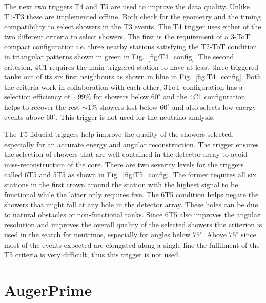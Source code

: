 The next two triggers T4 and T5 are used to improve the data quality. Unlike T1-T3 these are implemented offline. Both check for the geometry and the timing compatibility to select showers in the T3 events. The T4 trigger uses either of the two different criteria to select showers. The first is the requirement of a 3-ToT compact configuration i.e. three nearby stations satisfying the T2-ToT condition in triangular patterns shown in green in Fig.~\ref{fig:T4_config}. The second criterion, 4C1 requires the main triggered station to have at least three triggered tanks out of its six first neighbours as shown in blue in Fig.~\ref{fig:T4_config}. Both the criteria work in collaboration with each other, 3ToT configuration has a selection efficiency of $\sim$99\% for showers below $60^{\circ}$ and the 4C1 configuration helps to recover the rest $\sim$1\% showers lost below $60^{\circ}$ and also selects low energy events above $60^{\circ}$. This trigger is not used for the neutrino analysis.

The T5 fiducial triggers help improve the quality of the showers selected, especially for an accurate energy and angular reconstruction. The trigger ensures the selection of showers that are well contained in the detector array to avoid miss-reconstruction of the core. There are two severity levels for the triggers called 6T5 and 5T5 as shown in Fig.~\ref{fig:T5_config}. The former requires all six stations in the first crown around the station with the highest signal to be functional while the latter only requires five. The 6T5 condition helps negate the showers that might fall at any hole in the detector array. These holes can be due to natural obstacles or non-functional tanks. Since 6T5 also improves the angular resolution and improves the overall quality of the selected showers this criterion is used in the search for neutrinos, especially for angles below $75^{\circ}$. Above $75^{\circ}$ since most of the events expected are elongated along a single line the fulfilment of the T5 criteria is very difficult, thus this trigger is not used. 

\section{AugerPrime}
\label{sec:Aug_prime}

